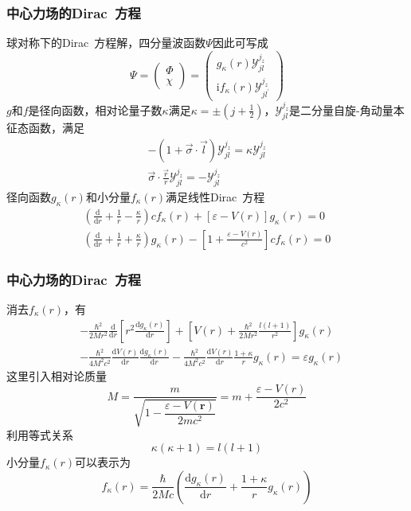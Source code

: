\frame
{
	\frametitle{中心力场的\textrm{Dirac~}方程}
	球对称下的\textrm{Dirac~}方程解，四分量波函数$\Psi$因此可写成
	\begin{displaymath}
		\Psi=\left( 
		\begin{matrix}
			\Phi\\
			\chi
		\end{matrix}
		\right)=\left( 
		\begin{matrix}
			g_{\kappa}(r)\mathcal{Y}_{jl}^{j_z}\\
			\mathrm{i}f_{\kappa}(r)\mathcal{Y}_{jl^{\prime}}^{j_z}
		\end{matrix}
		\right)
	\end{displaymath}
	$g$和$f$是径向函数，相对论量子数$\kappa$满足$\kappa=\pm(j+\frac12)$，$\mathcal{Y}_{jl}^{j_z}$是二分量自旋-角动量本征态函数，满足
	\begin{displaymath}
		\begin{aligned}
			-(1+\vec{\sigma}\cdot\vec l)\mathcal{Y}_{jl}^{j_z}=\kappa\mathcal{Y}_{jl}^{j_z}\\
			\vec{\sigma}\cdot\frac{\vec r}r\mathcal{Y}_{jl}^{j_z}=-\mathcal{Y}_{jl}^{j_z}
		\end{aligned}
	\end{displaymath}
	径向函数$g_{\kappa}(r)$和小分量$f_{\kappa}(r)$满足线性\textrm{Dirac~}方程
	\begin{displaymath}
		\begin{aligned}
			\left( \frac{\mathrm{d}}{\mathrm{d}r}+\frac1r-\frac{\kappa}r \right)cf_{\kappa}(r)+[\varepsilon-V(r)]g_{\kappa}(r)=0\\
			\left( \frac{\mathrm{d}}{\mathrm{d}r}+\frac1r+\frac{\kappa}r \right)g_{\kappa}(r)-\left[ 1+\frac{\varepsilon-V(r)}{c^2} \right]cf_{\kappa}(r)=0
		\end{aligned}
	\end{displaymath}
}

\frame
{
	\frametitle{中心力场的\textrm{Dirac~}方程}
	消去$f_{\kappa}(r)$，有
	\begin{displaymath}
		\begin{aligned}
			&-\frac{\hbar^2}{2Mr^2}\frac{\mathrm{d}}{\mathrm{d}r}\left[ r^2\frac{\mathrm{d}g_{\kappa}(r)}{\mathrm{d}r} \right]+\left[ V(r)+\frac{\hbar^2}{2Mr^2}\frac{l(l+1)}{r^2} \right]g_{\kappa}(r)\\
			&-\frac{\hbar^2}{4M^2c^2}\frac{\mathrm{d}V(r)}{\mathrm{d}r}\frac{\mathrm{d}g_{\kappa}(r)}{\mathrm{d}r}-\frac{\hbar^2}{4M^2c^2}\frac{\mathrm{d}V(r)}{\mathrm{d}r}\frac{1+\kappa}rg_{\kappa}(r)=\varepsilon g_{\kappa}(r)
		\end{aligned}
	\end{displaymath}
	这里引入相对论质量$$M=\dfrac{m}{\sqrt{1-\dfrac{\varepsilon-V(\mathbf{r})}{2mc^2}}}=m+\frac{\varepsilon-V(r)}{2c^2}$$
	利用等式关系$$\kappa(\kappa+1)=l(l+1)$$
	小分量$f_{\kappa}(r)$可以表示为
	\begin{displaymath}
		f_{\kappa}(r)=\frac{\hbar}{2Mc}\left( \frac{\mathrm{d}g_{\kappa}(r)}{\mathrm{d}r}+\frac{1+\kappa}rg_{\kappa}(r) \right)
	\end{displaymath}
}


